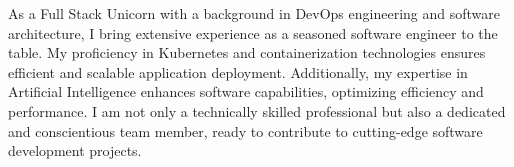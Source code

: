 

\begin{cvparagraph}

As a Full Stack Unicorn with a background in DevOps engineering and software architecture, I bring extensive experience as a seasoned software engineer to the table. My proficiency in Kubernetes and containerization technologies ensures efficient and scalable application deployment. Additionally, my expertise in Artificial Intelligence enhances software capabilities, optimizing efficiency and performance. I am not only a technically skilled professional but also a dedicated and conscientious team member, ready to contribute to cutting-edge software development projects.
\end{cvparagraph}